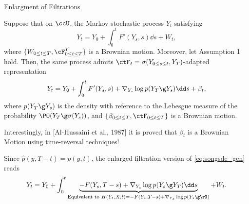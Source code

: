 \begin{frame}[allowframebreaks]{Enlargment of Filtrations}
\begin{Theorem}\label{theo:connection}
		Suppose that on $\ccU$, the Markov stochastic process $Y_t$ satisfying
		\begin{equation*}\label{gendir}
			Y_t=Y_0+\int_0^t F'(Y_s,s)\dd s+W_t,
		\end{equation*}
		where $\{W_{0\leq t\leq T},\cF^Y_{0\leq t\leq T}\}$ is a Brownian motion.
        Moreover, let Assumption 1 hold. Then, the same process admits $\ctF_t=\sigma(Y_{0\leq s\leq t},Y_T)$-adapted representation
		\begin{equation}\label{bridge}
			Y_t=Y_0+\int_0^t F'(Y_s,s)+\nabla_{Y_s}\log p(Y_T\g Y_s)\dd s+\beta_t,
		\end{equation}
		where $p(Y_T\g Y_s)$ is the density with reference to the Lebesgue measure of the probability $\PO(Y_T\g \sigma(Y_s))$, and $\{\beta_{0\leq t\leq T},\ctF_{0\leq t\leq T}\}$ is a Brownian motion.
	\end{Theorem}
    
\framebreak

    
Interestingly, in [Al-Hussaini et al.,  1987] it is proved that $\beta_t$ is a Brownian Motion using time-reversal techniques! 

Since $\hat{p}(y,T-t)={p}(y,t)$, the enlarged filtration version of \ref{eq:songsde_gen} reads 
	\begin{equation}\label{anders_them_2}
		Y_t=Y_0+\int_0^t \underbrace{-F(Y_s,T-s)+\nabla_{Y_s}\log p(Y_s\g Y_T)\dd s}_{\text{Equivalent to }H(Y_t,X,t)=-F(Y_s,T-s)+\nabla_{Y_s}\log p(Y_s\g \rX)}  +W_t.
	\end{equation}
	
\end{frame}

